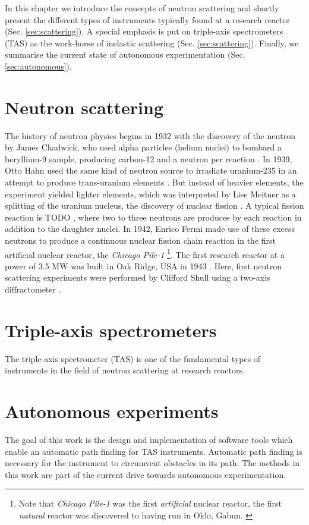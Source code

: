 In this chapter we introduce the concepts of neutron scattering and shortly present the different types of instruments typically found at a research reactor (Sec. \ref{sec:scattering}). A special emphasis is put on triple-axis spectrometers (TAS) as the work-horse of inelastic scattering (Sec. \ref{sec:scattering}). Finally, we summarise the current state of autonomous experimentation (Sec. \ref{sec:autonomous}).



\section{Neutron scattering \label{sec:scattering}}

The history of neutron physics begins in 1932 with the discovery of the neutron by James Chadwick, who used alpha particles (helium nuclei) to bombard a beryllium-9 sample, producing carbon-12 and a neutron per reaction \cite[p.1]{Jacrot2021}. 
In 1939, Otto Hahn used the same kind of neutron source to irradiate uranium-235 in an attempt to produce trans-uranium elements \cite{TODO}. But instead of heavier elements, the experiment yielded lighter elements, which was interpreted by Lise Meitner as a splitting of the uranium nucleus, the discovery of nuclear fission \cite{TODO}. A typical fission reaction is
TODO ,
where two to three neutrons are produces by each reaction in addition to the daughter nuclei.
In 1942, Enrico Fermi made use of these excess neutrons to produce a continuous nuclear fission chain reaction \cite[p.1]{Jacrot2021} in the first artificial nuclear reactor, the \textit{Chicago Pile-1} \footnote{Note that \textit{Chicago Pile-1} was the first \textit{artificial} nuclear reactor, the first \textit{natural} reactor was discovered to having run in Oklo, Gabun. \cite{TODO}}.
The first research reactor at a power of 3.5 MW was built in Oak Ridge, USA in 1943 \cite[p.3]{Jacrot2021}. Here, first neutron scattering experiments were performed by Clifford Shull using a two-axis diffractometer \cite[p.3]{Jacrot2021}.


\section{Triple-axis spectrometers \label{sec:tas}}

The triple-axis spectrometer (TAS) is one of the fundamental types of instruments in the field of neutron scattering at research reactors.




\section{Autonomous experiments \label{sec:autonomous}}

The goal of this work is the design and implementation of software tools which enable an automatic path finding for TAS instruments.
Automatic path finding is necessary for the instrument to circumvent obstacles in its path. The methods in this work are part of the current drive towards autonomous experimentation.
